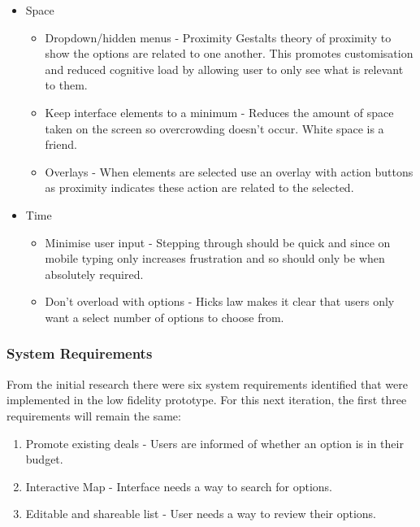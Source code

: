 \documentclass[a4 paper, 12pt]{article}
\begin{document}
\begin{itemize}
            \item Space 
                \begin{itemize}
                    \item Dropdown/hidden menus - Proximity Gestalts theory of proximity to show the options are related to one another. This promotes customisation and reduced cognitive load by allowing user to only see what is relevant to them.
                    \item Keep interface elements to a minimum - Reduces the amount of space taken on the screen so overcrowding doesn't occur. White space is a friend.
                    \item Overlays - When elements are selected use an overlay with action buttons as proximity indicates these action are related to the selected.
                \end{itemize}
            \item Time
                \begin{itemize}
                    \item Minimise user input - Stepping through should be quick and since on mobile typing only increases frustration and so should only be when absolutely required.
                    \item Don't overload with options - Hicks law makes it clear that users only want a select number of options to choose from.
                \end{itemize}
                   
           \end{itemize}    

    \subsubsection*{System Requirements}
    From the initial research there were six system requirements identified that were implemented in the low fidelity prototype. For this next iteration, the first three requirements will remain the same:
        \begin{enumerate}
            \item Promote existing deals - Users are informed of whether an option is in their budget.
            \item Interactive Map - Interface needs a way to search for options.
            \item Editable and shareable list - User needs a way to review their options.
        \end{enumerate}   
    
\end{document}
